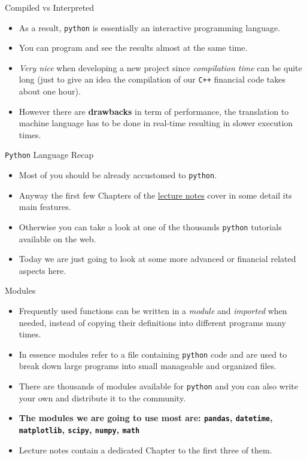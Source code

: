 \documentclass{beamer}
\begin{document}
\begin{frame}{Compiled vs Interpreted}
  \begin{itemize}
  \item As a result, \texttt{python} is essentially an interactive programming language.
  \item You can program and see the results almost at the same time. 
  \item \emph{Very nice} when developing a new project since \emph{compilation time} can be quite long (just to give an idea the compilation of our \texttt{C++} financial code takes about one hour). 
  \item However there are \textbf{drawbacks} in term of performance, the translation to machine language has to be done in real-time resulting in slower execution times.
  \end{itemize}
\end{frame}

\begin{frame}{\texttt{Python} Language Recap}
  \begin{itemize}
    \item Most of you should be already accustomed to \texttt{python}.
    \item Anyway the first few Chapters of the \href{https://drive.google.com/file/d/1GnlyuB4KkUbzqL7tf6nju-ZEqnfQrRa4/view?usp=drive_link}{lecture notes} cover in some detail its main features.
    \item Otherwise you can take a look at one of the thousands \texttt{python} tutorials available on the web.
    \item Today we are just going to look at some more advanced or financial related aspects here.
  \end{itemize}
\end{frame}

\begin{frame}[fragile]{Modules}
  \begin{itemize}
  \item Frequently used functions can be written in a \emph{module} and \emph{imported} when needed, instead of copying their definitions into different programs many times.
  \item In essence modules refer to a file containing \texttt{python} code and are used to break down large programs into small manageable and organized files. 
  \item There are thousands of modules available for \texttt{python} and you can also write your own and distribute it to the community.
  \item \textbf{The modules we are going to use most are: \texttt{pandas}, \texttt{datetime}, \texttt{matplotlib}, \texttt{scipy}, \texttt{numpy}, \texttt{math}}
  \item  Lecture notes contain a dedicated Chapter to the first three of them.
  \end{itemize}
\end{frame}
\end{document}
